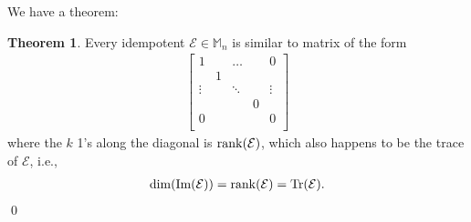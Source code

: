 \documentclass{article}
\theoremstyle{definition}
\newtheorem{thm}{Theorem}[section]
\newcommand{\E}{\mathcal{E}}
\newcommand{\ima}{\text{Im}}
\begin{document}
We have a theorem:

\begin{thm}
	Every idempotent $\E \in \mathbb{M}_n$ is similar to  matrix of the form
	\begin{align*}
	\begin{bmatrix}
	1 & & \dots & &0 \\
	& 1 & & &\\
	\vdots & & \ddots & &\vdots\\
	& & & 0 &\\
	0 & & & &0\\
	\end{bmatrix}
	\end{align*}
	where the $k$ 1's along the diagonal is $\rank(\E)$, which also happens to be the trace of $\E$, i.e.,
	\begin{align*}
	\dim(\ima(\E)) = \rank(\E) = \Tr(\E).
	\end{align*}
	\qed
\end{thm}
\end{document}
